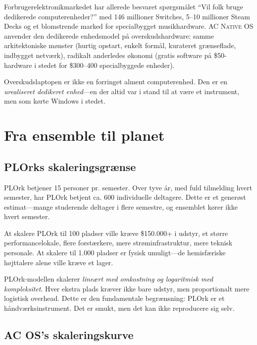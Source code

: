 \documentclass[10pt,letterpaper,twocolumn]{article}
\newcommand{\acos}{\textsc{AC Native OS}}
\begin{document}
Forbrugerelektronikmarkedet har allerede besvaret sp{\o}rgsm{\aa}let ``Vil folk bruge dedikerede computerenheder?'' med 146 millioner Switches, 5--10 millioner Steam Decks og et blomstrende marked for specialbygget musikhardware. \acos{} anvender den dedikerede enhedsmodel p{\aa} overskudshardware: samme arkitektoniske m{\o}nster (hurtig opstart, enkelt form{\aa}l, kurateret gr{\ae}nseflade, indbygget netv{\ae}rk), radikalt anderledes {\o}konomi (gratis software p{\aa} \$50-hardware i stedet for \$300--400 specialbyggede enheder).

Overskudslaptopen er ikke en forringet alment computerenhed. Den er en \emph{urealiseret dedikeret enhed}---en der altid var i stand til at v{\ae}re et instrument, men som k{\o}rte Windows i stedet.


\section{Fra ensemble til planet}
\label{sec:scaling}

\subsection{PLOrks skaleringsgrænse}

PLOrk betjener 15 personer pr. semester. Over tyve {\aa}r, med fuld tilmelding hvert semester, har PLOrk betjent ca. 600 individuelle deltagere. Dette er et generøst estimat---mange studerende deltager i flere semestre, og ensemblet k{\o}rer ikke hvert semester.

At skalere PLOrk til 100 pladser ville kr{\ae}ve \$150.000+ i udstyr, et st{\o}rre performancelokale, flere forst{\ae}rkere, mere str{\o}minfrastruktur, mere teknisk personale. At skalere til 1.000 pladser er fysisk umuligt---de hemisf{\ae}riske h{\o}jttalere alene ville kr{\ae}ve et lager.

PLOrk-modellen skalerer \emph{line{\ae}rt med omkostning og logaritmisk med kompleksitet}. Hver ekstra plads kr{\ae}ver ikke bare udstyr, men proportionalt mere logistisk overhead. Dette er den fundamentale begr{\ae}nsning: PLOrk er et h{\aa}ndv{\ae}rksinstrument. Det er smukt, men det kan ikke reproducere sig selv.

\subsection{AC OS's skaleringskurve}
\end{document}
